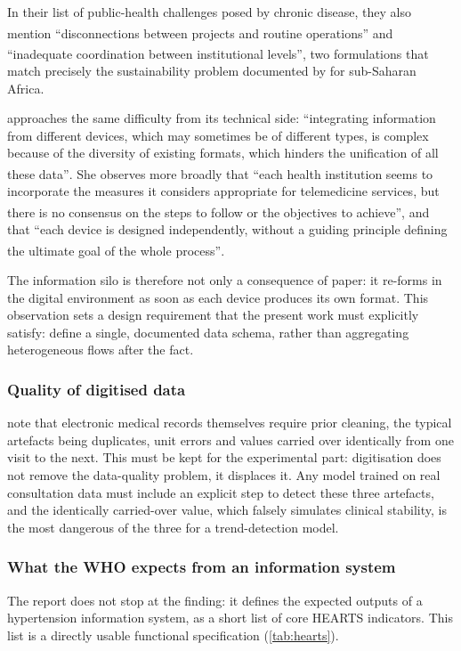 \documentclass[12pt,a4paper,oneside]{report}
\newcommand{\bq}[1]{``#1''\textsuperscript{\dag}}
\begin{document}
In their list of public-health challenges posed by chronic disease, they also mention \bq{disconnections between projects and routine operations} and \bq{inadequate coordination between institutional levels}, two formulations that match precisely the sustainability problem documented by \textcite{dodoo2022} for sub-Saharan Africa.

\textcite{navarro2023} approaches the same difficulty from its technical side: \bq{integrating information from different devices, which may sometimes be of different types, is complex because of the diversity of existing formats, which hinders the unification of all these data}. She observes more broadly that \bq{each health institution seems to incorporate the measures it considers appropriate for telemedicine services, but there is no consensus on the steps to follow or the objectives to achieve}, and that \bq{each device is designed independently, without a guiding principle defining the ultimate goal of the whole process}.

The information silo is therefore not only a consequence of paper: it re-forms in the digital environment as soon as each device produces its own format. This observation sets a design requirement that the present work must explicitly satisfy: define a single, documented data schema, rather than aggregating heterogeneous flows after the fact.

\subsubsection{Quality of digitised data}

\textcite{liu2025review} note that electronic medical records themselves require prior cleaning, the typical artefacts being duplicates, unit errors and values carried over identically from one visit to the next. This must be kept for the experimental part: digitisation does not remove the data-quality problem, it displaces it. Any model trained on real consultation data must include an explicit step to detect these three artefacts, and the identically carried-over value, which falsely simulates clinical stability, is the most dangerous of the three for a trend-detection model.

\subsubsection{What the WHO expects from an information system}\label{sec:hearts-spec}

The report does not stop at the finding: it defines the expected outputs of a hypertension information system, as a short list of core HEARTS indicators. This list is a directly usable functional specification (\cref{tab:hearts}).
\end{document}
